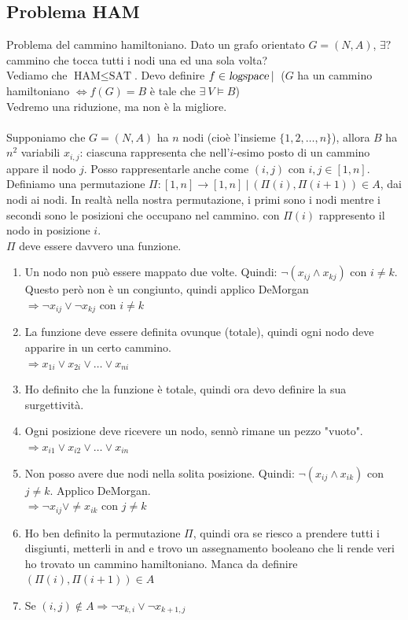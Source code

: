 \documentclass[10pt]{book}
\begin{document}
\subsection{Problema HAM}
Problema del cammino hamiltoniano. Dato un grafo orientato $G = (N, A)$, $\exists?$ cammino che tocca tutti i nodi una ed una sola volta?\\
Vediamo che $\text{HAM} \leq \text{SAT}$. Devo definire $f \in \textsl{logspace}\:|\:$ ($G$ ha un cammino hamiltoniano $\Leftrightarrow f(G) = B$ è tale che $\exists\:V\vDash B$)\\
Vedremo una riduzione, ma non è la migliore.\\\\
Supponiamo che $G = (N, A)$ ha $n$ nodi (cioè l'insieme $\{1, 2, \ldots, n\}$), allora $B$ ha $n^2$ variabili $x_{i,j}$: ciascuna rappresenta che nell'$i$-esimo posto di un cammino appare il nodo $j$. Posso rappresentarle anche come $(i, j)$ con $i, j \in [1, n]$.\\
Definiamo una permutazione $\Pi : [1, n] \rightarrow [1, n]\:|\:\left(\Pi(i), \Pi(i+1)\right) \in A$, dai nodi ai nodi. In realtà nella nostra permutazione, i primi sono i nodi mentre i secondi sono le posizioni che occupano nel cammino. con $\Pi(i)$ rappresento il nodo in posizione $i$.\\
$\Pi$ deve essere davvero una funzione.
\begin{enumerate}
	\item Un nodo non può essere mappato due volte. Quindi: $\neg(x_{ij} \wedge x_{kj})$ con $i \neq k$. Questo però non è un congiunto, quindi applico DeMorgan\\
	$\Longrightarrow \neg x_{ij} \vee \neg x_{kj}$ con $i \neq k$
	\item La funzione deve essere definita ovunque (totale), quindi ogni nodo deve apparire in un certo cammino.\\
	$\Longrightarrow x_{1i} \vee x_{2i} \vee \ldots \vee x_{ni}$
	\item[] Ho definito che la funzione è totale, quindi ora devo definire la sua surgettività.
	\item Ogni posizione deve ricevere un nodo, sennò rimane un pezzo "vuoto".\\
	$\Longrightarrow x_{i1} \vee x_{i2} \vee \ldots \vee x_{in}$
	\item Non posso avere due nodi nella solita posizione. Quindi: $\neg(x_{ij} \wedge x_{ik})$ con $j \neq k$. Applico DeMorgan.\\
	$\Longrightarrow \neg x_{ij} \vee \neq x_{ik}$ con $j \neq k$
	\item[] Ho ben definito la permutazione $\Pi$, quindi ora se riesco a prendere tutti i disgiunti, metterli in and e trovo un assegnamento booleano che li rende veri ho trovato un cammino hamiltoniano. Manca da definire $\left(\Pi(i), \Pi(i+1)\right) \in A$
	\item Se $(i, j) \not\in A \Longrightarrow \neg x_{k,i} \vee \neg x_{k+1, j}$
\end{enumerate}
\end{document}
